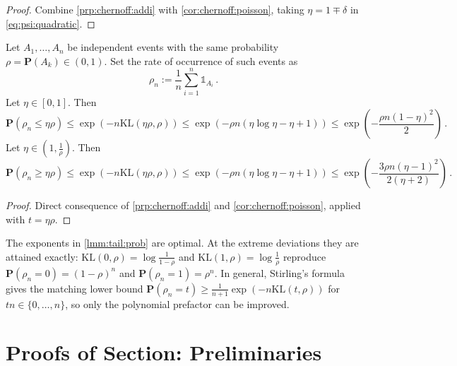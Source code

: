 \documentclass{article}
\newcommand{\lb}{\left(} %
\newcommand{\rb}{\right)} %
\newcommand{\br}[1]{\lb #1 \rb} %
\newcommand{\brOf}[1]{\!\br{#1}} %
\renewcommand{\Pr}{\mathbf{P}} %
\newcommand{\Prof}[1]{\Pr(#1)}
\newcommand{\PrOf}[1]{\Pr\brOf{#1}}
\newcommand{\ind}{\mathds{1}}%
\newcommand{\eqfs}{\,.}
\newcommand{\kullback}{\mathrm{K\!L}} %
\begin{document}
%
\begin{proof}
    Combine \cref{prp:chernoff:addi} with \cref{cor:chernoff:poisson}, taking
    $\eta = 1 \mp \delta$ in \eqref{eq:psi:quadratic}.
\end{proof}
%
\begin{lemma}\label{lmm:tail:prob}
    Let $A_1, \dots, A_n$ be independent events with the same probability
    $\rho = \Prof{A_k} \in (0,1)$. Set the rate of occurrence of such events as
    \begin{equation}
        \rho_n := \frac1n \sum_{i=1}^n \ind_{A_i}
        \eqfs
    \end{equation}
    Let $\eta \in [0,1]$. Then
    \begin{equation}\label{eq:tail:lower}
        \PrOf{\rho_n \leq \eta\rho}
        \leq
        \exp\brOf{-n \kullback(\eta\rho, \rho)}
        \leq
        \exp\brOf{-\rho n \br{\eta\log\eta - \eta + 1}}
        \leq
        \exp\brOf{-\frac{\rho n (1-\eta)^2}{2}}
        \eqfs
    \end{equation}
    Let $\eta \in \br{1, \frac1\rho}$. Then
    \begin{equation}\label{eq:tail:upper}
        \PrOf{\rho_n \geq \eta \rho}
        \leq
        \exp\brOf{-n \kullback(\eta\rho, \rho)}
        \leq
        \exp\brOf{-\rho n \br{\eta\log\eta - \eta + 1}}
        \leq
        \exp\brOf{-\frac{3 \rho n (\eta-1)^2}{2(\eta+2)}}
        \eqfs
    \end{equation}
\end{lemma}
%
\begin{proof}
    Direct consequence of \cref{prp:chernoff:addi} and
    \cref{cor:chernoff:poisson}, applied with $t = \eta\rho$.
\end{proof}
%
\begin{remark}[Tightness]\label{rmk:tail:tight}
    The exponents in \cref{lmm:tail:prob} are optimal. At the extreme deviations
    they are attained exactly: $\kullback(0,\rho) = \log\frac{1}{1-\rho}$ and
    $\kullback(1,\rho) = \log\frac1\rho$ reproduce
    $\PrOf{\rho_n = 0} = (1-\rho)^n$ and $\PrOf{\rho_n = 1} = \rho^n$. In general,
    Stirling's formula gives the matching lower bound
    $\PrOf{\rho_n = t} \geq \frac{1}{n+1} \exp\brOf{-n \kullback(t,\rho)}$ for
    $t n \in \{0, \dots, n\}$, so only the polynomial prefactor can be improved.
\end{remark}
\section{Proofs of Section: Preliminaries}\label{sec:proof:prelim}
\end{document}
